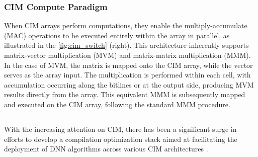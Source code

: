 \subsubsection{CIM Compute Paradigm}
When CIM arrays perform computations, they enable the multiply-accumulate (MAC) operations to be executed entirely within the array in parallel, as illustrated in the \fig \ref{fig:cim_switch} (right). This architecture inherently supports matrix-vector multiplication (MVM) and matrix-matrix multiplication (MMM).
In the case of MVM, the matrix is mapped onto the CIM array, while the vector serves as the array input. 
The multiplication is performed within each cell, with accumulation occurring along the bitlines or at the output side, producing MVM results directly from the array.
 This equivalent MMM is subsequently mapped and executed on the CIM array, following the standard MMM procedure.



\subsection{}
With the increasing attention on CIM, there has been a significant surge in efforts to develop a compilation optimization stack aimed at facilitating the deployment of DNN algorithms across various CIM architectures \cite{siemieniuk2021occ,sun2023pimcomp,qu2024cim,ankit2019puma}. 

